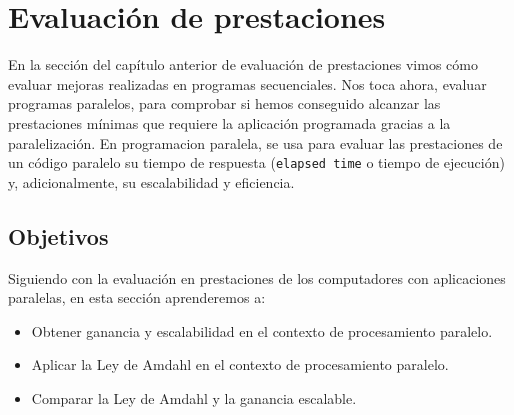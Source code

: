 \newpage
\section{Evaluación de prestaciones}
En la sección del capítulo anterior de evaluación de prestaciones vimos cómo evaluar mejoras realizadas en programas secuenciales. Nos toca ahora, evaluar programas paralelos, para comprobar si hemos conseguido alcanzar las prestaciones mínimas que requiere la aplicación programada gracias a la paralelización. En programacion paralela, se usa para evaluar las prestaciones de un código paralelo su tiempo de respuesta (\verb|elapsed time| o tiempo de ejecución) y, adicionalmente, su escalabilidad y eficiencia.

\subsection{Objetivos}
Siguiendo con la evaluación en prestaciones de los computadores con aplicaciones paralelas, en esta sección aprenderemos a:
\begin{itemize}
    \item Obtener ganancia y escalabilidad en el contexto de procesamiento paralelo.
    \item Aplicar la Ley de Amdahl en el contexto de procesamiento paralelo.
    \item Comparar la Ley de Amdahl y la ganancia escalable.
\end{itemize}





































